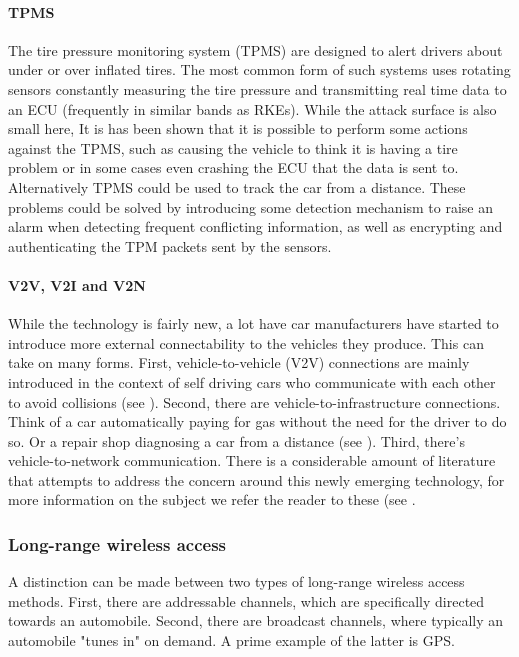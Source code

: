 \documentclass[11pt]{article}
\begin{document}
\paragraph{TPMS} The tire pressure monitoring system (TPMS) are designed to alert drivers about under or over inflated tires. The most common form of such systems uses rotating sensors constantly measuring the tire pressure and transmitting real time data to an ECU (frequently in similar bands as RKEs)\cite{Kosher}. While the attack surface is also small here, It is has been shown that it is possible to perform some actions against the TPMS, such as causing the vehicle to think it is having a tire problem\cite{TPMS} or in some cases even crashing the ECU that the data is sent to\cite{MillerA}. Alternatively TPMS could be used to track the car from a distance\cite{TPMS}. These problems could be solved by introducing some detection mechanism to raise an alarm when detecting frequent conflicting information, as well as encrypting and authenticating the TPM packets sent by the sensors\cite{TPMS}.

\paragraph{V2V, V2I and V2N} While the technology is fairly new, a lot have car manufacturers have started to introduce more external connectability to the vehicles they produce. This can take on many forms\cite{Ahmed}. First, vehicle-to-vehicle (V2V) connections are mainly introduced in the context of self driving cars who communicate with each other to avoid collisions (see \cite{Enisa}). Second, there are vehicle-to-infrastructure connections. Think of a car automatically paying for gas without the need for the driver to do so. Or a repair shop diagnosing a car from a distance (see \cite{Kleberger}). Third, there's vehicle-to-network communication. There is a considerable amount of literature that attempts to address the concern around this newly emerging technology, for more information on the subject we refer the reader to these (see \cite{Kleberger15}\cite{Russel17}\cite{Maxim}\cite{Crispo}.

\subsubsection{Long-range wireless access}

A distinction can be made between two types of long-range wireless access methods. First, there are addressable channels, which are specifically directed towards an automobile. Second, there are broadcast channels, where typically an automobile "tunes in" on demand. A prime example of the latter is GPS.
\end{document}
